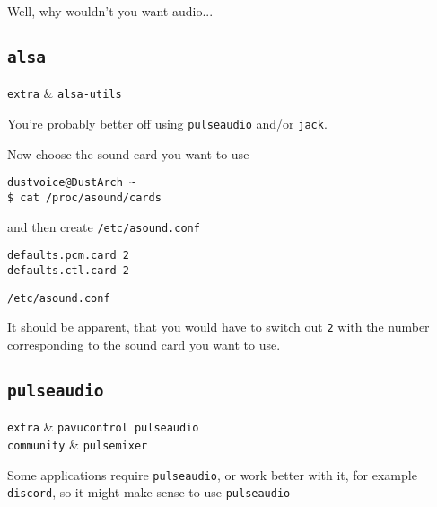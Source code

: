 \documentclass[10pt]{dustdoc}
\begin{document}
Well, why wouldn’t you want audio...

\subsection{\texttt{alsa}}
\label{sec:alsa}

\begin{packagetable}
    \texttt{extra} & \texttt{alsa-utils} \\
\end{packagetable}

\begin{NOTE}
    You’re probably better off using \texttt{pulseaudio} and/or \texttt{jack}.
\end{NOTE}

Now choose the sound card you want to use

\begin{verbatim}
dustvoice@DustArch ~
$ cat /proc/asound/cards
\end{verbatim}

\noindent
and then create \texttt{/etc/asound.conf}

\begin{mintedlisting}
    \begin{verbatim}
defaults.pcm.card 2
defaults.ctl.card 2
    \end{verbatim}

    \caption{\texttt{/etc/asound.conf}}
\end{mintedlisting}

\begin{NOTE}
    It should be apparent, that you would have to switch out \texttt{2} with the number corresponding to the sound card you want to use.
\end{NOTE}

\subsection{\texttt{pulseaudio}}
\label{sec:pulseaudio}

\begin{packagetable}
    \texttt{extra} & \texttt{pavucontrol pulseaudio} \\
    \texttt{community} & \texttt{pulsemixer} \\
\end{packagetable}

Some applications require \texttt{pulseaudio}, or work better with it, for example \texttt{discord}, so it might make sense to use \texttt{pulseaudio}
\end{document}
